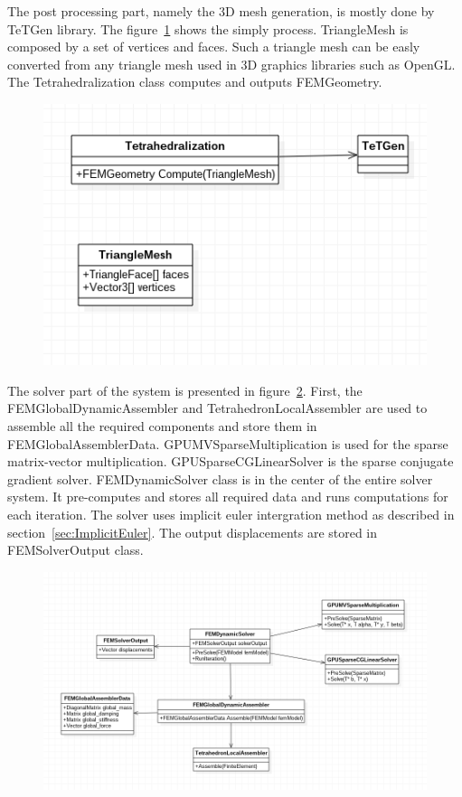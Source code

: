 \documentclass[en]{minipw} %
\begin{document}
The post processing part, namely the 3D mesh generation, is mostly done by TeTGen library. The figure~\ref{fig:uml_tetrahedralization} shows the simply process. TriangleMesh is composed by a set of vertices and faces. Such a triangle mesh can be easly converted from any triangle mesh used in 3D graphics libraries such as OpenGL. The Tetrahedralization class computes and outputs FEMGeometry.

\begin{figure}[h!]
\centering
\includegraphics[scale=0.6]{pictures/tetrahedralization.png}
\caption[Logo MiNI]{}
\label{fig:uml_tetrahedralization}
\end{figure}

The solver part of the system is presented in figure~\ref{fig:uml_solver}. First, the FEMGlobalDynamicAssembler and TetrahedronLocalAssembler are used to assemble all the required components and store them in FEMGlobalAssemblerData. GPUMVSparseMultiplication is used for the sparse matrix-vector multiplication. GPUSparseCGLinearSolver is the sparse conjugate gradient solver. FEMDynamicSolver class is in the center of the entire solver system. It pre-computes and stores all required data and runs computations for each iteration. The solver uses implicit euler intergration method as described in section~\ref{sec:ImplicitEuler}. The output displacements are stored in FEMSolverOutput class.

\begin{figure}[h!]
\centering
\includegraphics[scale=0.5]{pictures/solver.png}
\caption[Logo MiNI]{}
\label{fig:uml_solver}
\end{figure}
\end{document}
